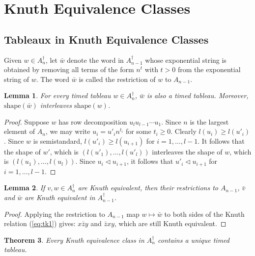 \documentclass[10pt]{amsproc}
\newtheorem{theorem}{Theorem}[subsection]
\newtheorem{lemma}[theorem]{Lemma}
\theoremstyle{definition}
\theoremstyle{remark}
\newcommand{\shape}{\mathrm{shape}}
\begin{document}
\section{Knuth Equivalence Classes}
\label{sec:knuth-classes}
\subsection{Tableaux in Knuth Equivalence Classes}
\label{sec:tabl-knuth-equiv}
Given $w\in A_n^\dagger$, let $\bar w$ denote the word in $A_{n-1}^\dagger$ whose exponential string is obtained by removing all terms of the form $n^t$ with $t>0$ from the exponential string of $w$.
The word $\bar w$ is called the restriction of $w$ to $A_{n-1}$.
\begin{lemma}
  \label{lemma:restriction-interleaf}
  For every timed tableau $w\in A_n^\dagger$, $\bar w$ is also a timed tableau. Moreover, $\shape(\bar w)$ interleaves $\shape(w)$.
\end{lemma}
\begin{proof}
  Suppose $w$ has row decomposition $u_lu_{l-1}\dotsb u_1$.
  Since $n$ is the largest element of $A_n$, we may write $u_i=u'_in^{t_i}$ for some $t_i\geq 0$.
  Clearly $l(u_i)\geq l(u'_i)$.
  Since $w$ is semistandard, $l(u'_i)\geq l(u_{i+1})$ for $i=1,\dotsc,l-1$. 
  It follows that the shape of $w'$, which is $(l(u'_1),\dotsc,l(u'_l))$ interleaves the shape of $w$, which is $(l(u_1),\dotsc,l(u_l))$.
  Since $u_i\lhd u_{i+1}$, it follows that $u'_i\lhd u_{i+1}$ for $i=1,\dotsc,l-1$.
\end{proof}
\begin{lemma}
  \label{lemma:equivalence-restriction}
  If $v,w\in A_n^\dagger$ are Knuth equivalent, then their restrictions to $A_{n-1}$, $\bar v$ and $\bar w$ are Knuth equivalent in $A_{n-1}^\dagger$.
\end{lemma}
\begin{proof}
  Applying the restriction to $A_{n-1}$ map $w\mapsto \bar w$ to both sides of the Knuth relation (\ref{eq:tk1}) gives:
  $x\bar z y$ and $\bar z x y$, which are still Knuth equivalent.
\end{proof}
\begin{theorem}
  \label{theorem:unique-timed-tableaux}
  Every Knuth equivalence class in $A_n^\dagger$ contains a unique timed tableau.
\end{theorem}
\end{document}
